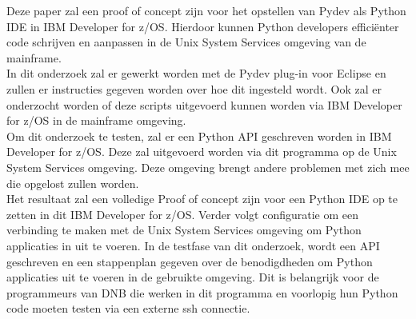 Deze paper zal een proof of concept zijn voor het opstellen van Pydev als Python IDE in IBM Developer for z/OS. Hierdoor kunnen Python developers efficiënter code schrijven en aanpassen in de Unix System Services omgeving van de mainframe. \\

In dit onderzoek zal er gewerkt worden met de Pydev plug-in voor Eclipse en zullen er instructies gegeven worden over hoe dit ingesteld wordt. Ook zal er onderzocht worden of deze scripts uitgevoerd kunnen worden via IBM Developer for z/OS in de mainframe omgeving. \\

Om dit onderzoek te testen, zal er een Python API geschreven worden in IBM Developer for z/OS. Deze zal uitgevoerd worden via dit programma op de Unix System Services omgeving. Deze omgeving brengt andere problemen met zich mee die opgelost zullen worden. \\

Het resultaat zal een volledige Proof of concept zijn voor een Python IDE op te zetten in dit IBM Developer for z/OS. Verder volgt configuratie om een verbinding te maken met de Unix System Services omgeving om Python applicaties in uit te voeren. In de testfase van dit onderzoek, wordt een API geschreven en een stappenplan gegeven over de benodigdheden om Python applicaties uit te voeren in de gebruikte omgeving. Dit is belangrijk voor de programmeurs van DNB die werken in dit programma en voorlopig hun Python code moeten testen via een externe ssh connectie.
